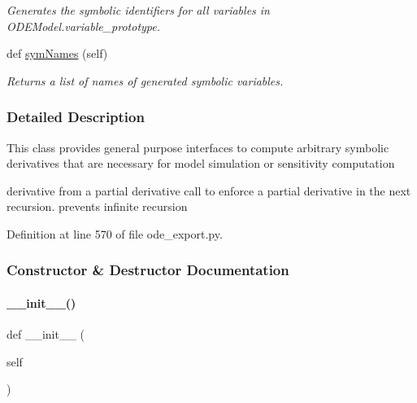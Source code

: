 \begin{DoxyCompactItemize}
\begin{DoxyCompactList}\small\item\em Generates the symbolic identifiers for all variables in O\+D\+E\+Model.\+variable\+\_\+prototype. \end{DoxyCompactList}\item 
def \mbox{\hyperlink{classamici_1_1ode__export_1_1_o_d_e_model_a2223bbe62f3234b8f40c5a566064a481}{sym\+Names}} (self)
\begin{DoxyCompactList}\small\item\em Returns a list of names of generated symbolic variables. \end{DoxyCompactList}\end{DoxyCompactItemize}


\subsubsection{Detailed Description}
This class provides general purpose interfaces to compute arbitrary symbolic derivatives that are necessary for model simulation or sensitivity computation

\begin{DoxyVerb}    derivative from a partial derivative call to enforce a partial
    derivative in the next recursion. prevents infinite recursion\end{DoxyVerb}
 

Definition at line 570 of file ode\+\_\+export.\+py.



\subsubsection{Constructor \& Destructor Documentation}
\mbox{\label{classamici_1_1ode__export_1_1_o_d_e_model_ae64f0875afe3067b97ba370b354b9213}} 
\paragraph{\texorpdfstring{\+\_\+\+\_\+init\+\_\+\+\_\+()}{\_\_init\_\_()}}
{\footnotesize\ttfamily def \+\_\+\+\_\+init\+\_\+\+\_\+ (\begin{DoxyParamCaption}\item[{}]{self }\end{DoxyParamCaption})}

